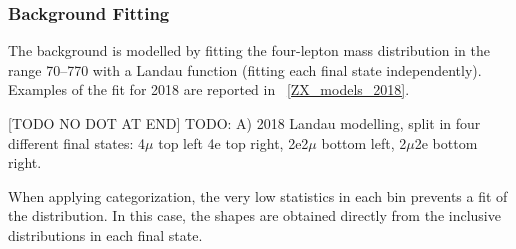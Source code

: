 \subsubsection{Background Fitting}
The background is modelled by fitting the four-lepton mass distribution in the range 70--770\GeV
with a Landau function (fitting each final state independently).
Examples of the fit for 2018 are reported in \figurename~\ref{ZX_models_2018}.
\begin{multiFigure}
	\centering
		[TODO NO DOT AT END]
		{TODO:
		\;A) 
		2018 \ZplusX Landau modelling, split in four different final states:
		4$\mu$ top left 4e top right, 2e2$\mu$ bottom left, 2$\mu$2e bottom right.}
	\label{ZX_models_2018}
\end{multiFigure}
When applying categorization, the very low statistics in each bin prevents a fit of the distribution.
In this case, the shapes are obtained directly from the inclusive distributions in each final state.



